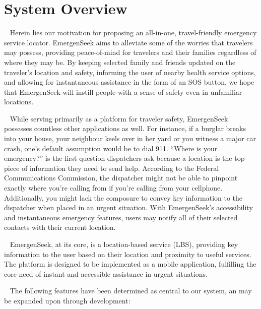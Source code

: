 \documentclass[10pt]{article}
\begin{document}
\section{System Overview}
\par ~ Herein lies our motivation for proposing an all-in-one, travel-friendly emergency service locator. EmergenSeek aims to alleviate some of the worries that travelers may possess, providing peace-of-mind for travelers and their families regardless of where they may be. By keeping selected family and friends updated on the traveler’s location and safety, informing the user of nearby health service options, and allowing for instantaneous assistance in the form of an SOS button, we hope that EmergenSeek will instill people with a sense of safety even in unfamiliar locations.
\par ~ While serving primarily as a platform for traveler safety, EmergenSeek possesses countless other applications as well. For instance, if a burglar breaks into your house, your neighbour keels over in her yard or you witness a major car crash, one’s default assumption would be to dial 911. “Where is your emergency?” is the first question dispatchers ask because a location is the top piece of information they need to send help. According to the Federal Communications Commission, the dispatcher might not be able to pinpoint exactly where you’re calling from if you’re calling from your cellphone. Additionally, you might lack the composure to convey key information to the dispatcher when placed in an urgent situation. With EmergenSeek’s accessibility and instantaneous emergency features, users may notify all of their selected contacts with their current location.
\par ~ EmergenSeek, at its core, is a location-based service (LBS), providing key information to the user based on their location and proximity to useful services. The platform is designed to be implemented as a mobile application, fulfilling the core need of instant and accessible assistance in urgent situations.
\par ~ The following features have been determined as central to our system, an may be expanded upon through development:
\end{document}
